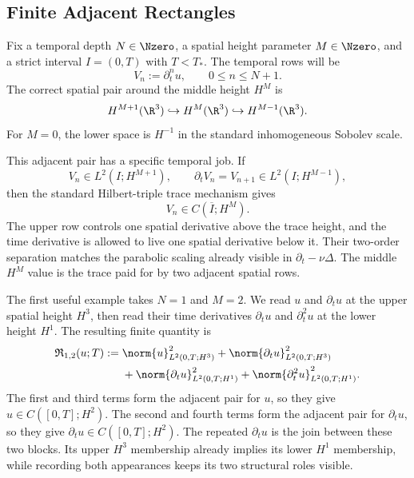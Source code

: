 
\subsection{Finite Adjacent Rectangles}\label{sub:FiniteAdjacentRectangles}

Fix a temporal depth \(N\in\Nzero\), a spatial height parameter \(M\in\Nzero\), and a strict interval \(I=(0,T)\) with \(T<T_*\).
The temporal rows will be
\[
  V_n:=\partial_t^n u,
  \qquad
  0\leq n\leq N+1.
\]
The correct spatial pair around the middle height \(H^M\) is
\[
  H^{M+1}(\R^3)
  \hookrightarrow
  H^M(\R^3)
  \hookrightarrow
  H^{M-1}(\R^3).
\]
For \(M=0\), the lower space is \(H^{-1}\) in the standard inhomogeneous Sobolev scale.

This adjacent pair has a specific temporal job.
If
\[
  V_n\in L^2(I;H^{M+1}),
  \qquad
  \partial_tV_n=V_{n+1}\in L^2(I;H^{M-1}),
\]
then the standard Hilbert-triple trace mechanism gives
\[
  V_n\in C(\overline I;H^M).
\]
The upper row controls one spatial derivative above the trace height, and the time derivative is allowed to live one spatial derivative below it.
Their two-order separation matches the parabolic scaling already visible in \(\partial_t-\nu\Delta\).
The middle \(H^M\) value is the trace paid for by two adjacent spatial rows.

The first useful example takes \(N=1\) and \(M=2\).
We read \(u\) and \(\partial_tu\) at the upper spatial height \(H^3\), then read their time derivatives \(\partial_tu\) and \(\partial_t^2u\) at the lower height \(H^1\).
The resulting finite quantity is
\begin{align*}
  \mathfrak R_{1,2}(u;T)
  :={}&
  \norm{u}_{L^2(0,T;H^3)}^2
  +
  \norm{\partial_tu}_{L^2(0,T;H^3)}^2
  \\
  &+
  \norm{\partial_tu}_{L^2(0,T;H^1)}^2
  +
  \norm{\partial_t^2u}_{L^2(0,T;H^1)}^2.
\end{align*}
The first and third terms form the adjacent pair for \(u\), so they give \(u\in C([0,T];H^2)\).
The second and fourth terms form the adjacent pair for \(\partial_tu\), so they give \(\partial_tu\in C([0,T];H^2)\).
The repeated \(\partial_tu\) is the join between these two blocks.
Its upper \(H^3\) membership already implies its lower \(H^1\) membership, while recording both appearances keeps its two structural roles visible.

